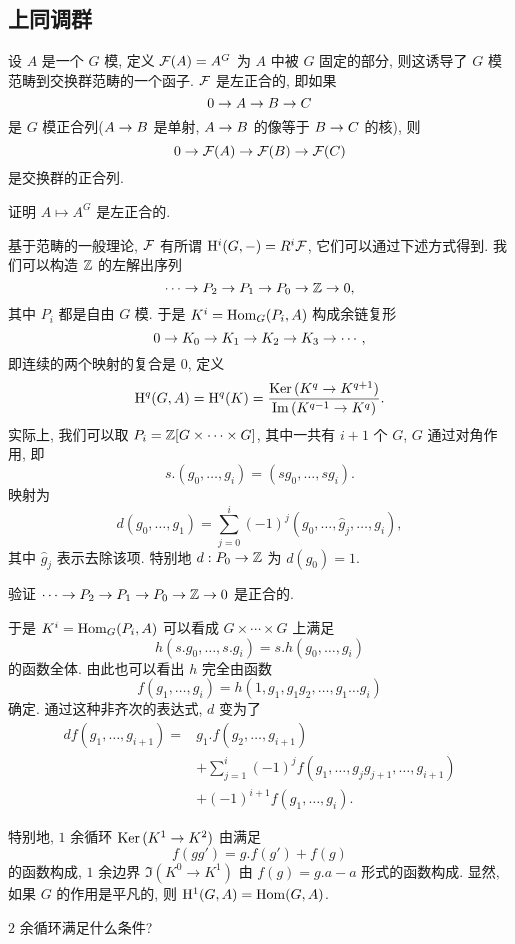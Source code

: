 \subsection{上同调群}

设 $A$ 是一个 $G$ 模, 定义 ${\mathcal{F}}(A)=A^G$ 为 $A$ 中被 $G$ 固定的部分, 则这诱导了 $G$ 模范畴到交换群范畴的一个函子. ${\mathcal{F}}$ 是左正合的, 即如果
  \[0\rightarrow A\rightarrow B\rightarrow C\]
是 $G$ 模正合列($A\rightarrow B$ 是单射, $A\rightarrow B$ 的像等于 $B\rightarrow C$ 的核), 则
  \[0\rightarrow {\mathcal{F}}(A)\rightarrow {\mathcal{F}}(B)\rightarrow {\mathcal{F}}(C)\]
是交换群的正合列.

\begin{exercise}
证明 $A\mapsto A^G$ 是左正合的.
\end{exercise}

基于范畴的一般理论, ${\mathcal{F}}$ 有所谓 ${\mathrm{H}}^i(G,-)=R^i{\mathcal{F}}$, 它们可以通过下述方式得到. 我们可以构造 ${\mathbb{Z}}$ 的左解出序列
  \[\cdots\rightarrow P_2\rightarrow P_1\rightarrow P_0\rightarrow {\mathbb{Z}}\rightarrow 0,\]
其中 $P_i$ 都是自由 $G$ 模. 于是 $K^i={\mathrm{Hom}}_G(P_i,A)$ 构成余链复形
  \[0\rightarrow K_0\rightarrow K_1\to K_2\to K_3\to\cdots,\]
即连续的两个映射的复合是 $0$, 定义
  \[{\mathrm{H}}^q(G,A)={\mathrm{H}}^q(K)=\frac{{\mathrm{Ker}\,}(K^q\to K^{q+1})}{{\mathrm{Im}\,}(K^{q-1}\to K^q)}.\]
实际上, 我们可以取 $P_i={\mathbb{Z}}[G\times \cdots\times G]$, 其中一共有 $i+1$ 个 $G$, $G$ 通过对角作用, 即
  \[s.(g_0,\dots,g_i)=(sg_0,\dots,sg_i).\]
映射为
  \[d(g_0,\dots,g_1)=\sum_{j=0}^i (-1)^j(g_0,\dots,\hat g_j,\dots,g_i),\]
其中 $\hat g_j$ 表示去除该项. 特别地 $d:P_0\to{\mathbb{Z}}$ 为 $d(g_0)=1$.

\begin{exercise}
验证 $\cdots\rightarrow P_2\rightarrow P_1\rightarrow P_0\rightarrow {\mathbb{Z}}\rightarrow 0$ 是正合的.
\end{exercise}

于是 $K^i={\mathrm{Hom}}_G(P_i,A)$ 可以看成 $G\times\cdots\times G$ 上满足
  \[h(s.g_0,\dots,s.g_i)=s.h(g_0,\dots,g_i)\]
的函数全体. 由此也可以看出 $h$ 完全由函数
  \[f(g_1,\dots,g_i)=h(1,g_1,g_1g_2,\dots,g_1\dots g_i)\]
确定. 通过这种非齐次的表达式, $d$ 变为了
  \[\begin{split}
  df(g_1,\dots,g_{i+1})=&g_1.f(g_2,\dots,g_{i+1})\\
  &+\sum_{j=1}^{i}(-1)^j f(g_1,\dots,g_jg_{j+1},\dots,g_{i+1})\\
  &+(-1)^{i+1}f(g_1,\dots,g_i).
  \end{split}\]

特别地, $1$ 余循环 ${\mathrm{Ker}\,}(K^1\to K^2)$ 由满足
  \[f(gg')=g.f(g')+f(g)\]
的函数构成, $1$ 余边界 $\Im(K^0\to K^1)$ 由 $f(g)=g.a-a$ 形式的函数构成. 显然, 如果 $G$ 的作用是平凡的, 则 ${\mathrm{H}}^1(G,A)={\mathrm{Hom}}(G,A)$. 

\begin{exercise}
$2$ 余循环满足什么条件?
\end{exercise}

